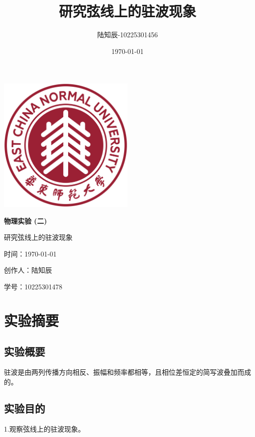 \documentclass{ctexart}
\title{研究弦线上的驻波现象}
\author{陆知辰-10225301456}
\date{\today}
\begin{document}
\begin{titlepage}
  \centering
  \includegraphics[width=0.5\textwidth]{ecnu.png}
  
  \vspace*{\baselineskip}
  
  \Huge\textbf{物\quad 理\quad 实\quad 验 \quad (二)}
  \vspace*{0.3\baselineskip}
  
  \huge 研究弦线上的驻波现象
  
  \vspace*{2\baselineskip}
  
  \large 时间：\today
  
  \vspace*{\baselineskip}
  
  \large 创作人：陆知辰
  
  \vspace*{\baselineskip}
  
  \large 学号：10225301478
  
\end{titlepage}
\newpage
\tableofcontents
\newpage
\section{实验摘要}
  \subsection{实验概要}
  驻波是由两列传播方向相反、振幅和频率都相等，且相位差恒定的简写波叠加而成的。

  \subsection{实验目的}
  1.\quad 观察弦线上的驻波现象。
\end{document}
